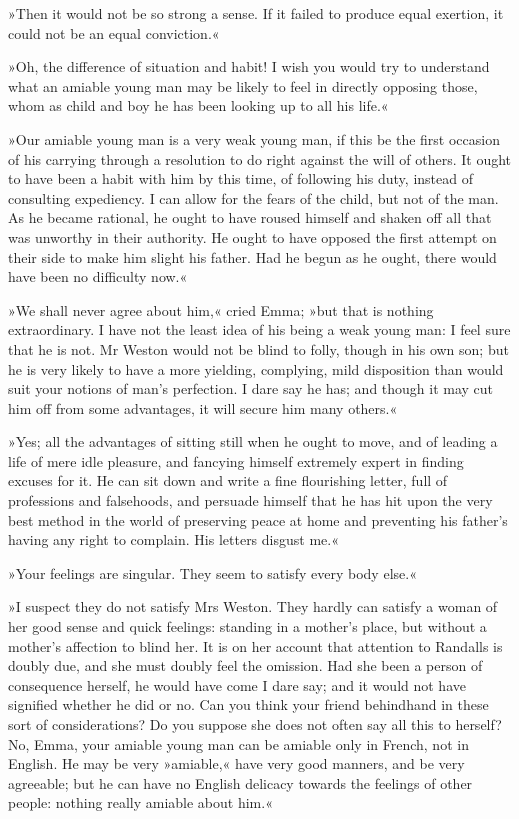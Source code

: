»Then it would not be so strong a sense. If it failed to produce equal exertion, it could not be an equal conviction.«

»Oh, the difference of situation and habit! I wish you would try to understand what an amiable young man may be likely to feel in directly opposing those, whom as child and boy he has been looking up to all his life.«

»Our amiable young man is a very weak young man, if this be the first occasion of his carrying through a resolution to do right against the will of others. It ought to have been a habit with him by this time, of following his duty, instead of consulting expediency. I can allow for the fears of the child, but not of the man. As he became rational, he ought to have roused himself and shaken off all that was unworthy in their authority. He ought to have opposed the first attempt on their side to make him slight his father. Had he begun as he ought, there would have been no difficulty now.«

»We shall never agree about him,« cried Emma; »but that is nothing extraordinary. I have not the least idea of his being a weak young man: I feel sure that he is not. Mr Weston would not be blind to folly, though in his own son; but he is very likely to have a more yielding, complying, mild disposition than would suit your notions of man's perfection. I dare say he has; and though it may cut him off from some advantages, it will secure him many others.«

»Yes; all the advantages of sitting still when he ought to move, and of leading a life of mere idle pleasure, and fancying himself extremely expert in finding excuses for it. He can sit down and write a fine flourishing letter, full of professions and falsehoods, and persuade himself that he has hit upon the very best method in the world of preserving peace at home and preventing his father's having any right to complain. His letters disgust me.«

»Your feelings are singular. They seem to satisfy every body else.«

»I suspect they do not satisfy Mrs Weston. They hardly can satisfy a woman of her good sense and quick feelings: standing in a mother's place, but without a mother's affection to blind her. It is on her account that attention to Randalls is doubly due, and she must doubly feel the omission. Had she been a person of consequence herself, he would have come I dare say; and it would not have signified whether he did or no. Can you think your friend behindhand in these sort of considerations? Do you suppose she does not often say all this to herself? No, Emma, your amiable young man can be amiable only in French, not in English. He may be very »amiable,« have very good manners, and be very agreeable; but he can have no English delicacy towards the feelings of other people: nothing really amiable about him.«

